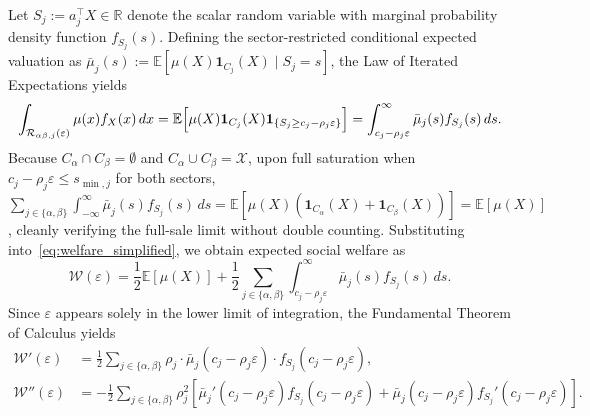 Let $S_j := a_j^\top X \in \mathbb{R}$ denote the scalar random variable with marginal probability density function $f_{S_j}(s)$. Defining the sector-restricted conditional expected valuation as $\bar{\mu}_j(s) := \mathbb{E}[\mu(X)\mathbf{1}_{C_j}(X) \mid S_j = s]$, the Law of Iterated Expectations yields
\begin{equation}
\label{eq:lie_disintegration_step}
\int_{\mathcal{R}_{\alpha\beta, j}(\varepsilon)} \mu(x) f_X(x) \, dx = \mathbb{E}\Bigl[\mu(X) \mathbf{1}_{C_j}(X) \mathbf{1}_{\{S_j \ge c_j - \rho_j \varepsilon\}}\Bigr] = \int_{c_j - \rho_j \varepsilon}^\infty \bar{\mu}_j(s) f_{S_j}(s) \, ds.
\end{equation}
Because $C_\alpha \cap C_\beta = \emptyset$ and $C_\alpha \cup C_\beta = \mathcal{X}$, upon full saturation when $c_j - \rho_j \varepsilon \le s_{\min, j}$ for both sectors, $\sum_{j \in \{\alpha, \beta\}} \int_{-\infty}^\infty \bar{\mu}_j(s) f_{S_j}(s) \, ds = \mathbb{E}[\mu(X)(\mathbf{1}_{C_\alpha}(X) + \mathbf{1}_{C_\beta}(X))] = \mathbb{E}[\mu(X)]$, cleanly verifying the full-sale limit without double counting. Substituting into~\eqref{eq:welfare_simplified}, we obtain expected social welfare as
\begin{equation}
\label{eq:welfare_1d_disintegration}
\mathcal{W}(\varepsilon) = \frac{1}{2} \mathbb{E}[\mu(X)] + \frac{1}{2} \sum_{j \in \{\alpha, \beta\}} \int_{c_j - \rho_j \varepsilon}^{\infty} \bar{\mu}_j(s) f_{S_j}(s) \, ds.
\end{equation}
Since $\varepsilon$ appears solely in the lower limit of integration, the Fundamental Theorem of Calculus yields
\begin{align}
\label{eq:w_prime_full}
\mathcal{W}'(\varepsilon) &= \frac{1}{2} \sum_{j \in \{\alpha, \beta\}} \rho_j \cdot \bar{\mu}_j(c_j - \rho_j \varepsilon) \cdot f_{S_j}(c_j - \rho_j \varepsilon), \\
\label{eq:w_double_prime_full}
\mathcal{W}''(\varepsilon) &= -\frac{1}{2} \sum_{j \in \{\alpha, \beta\}} \rho_j^2 \left[ \bar{\mu}_j'(c_j - \rho_j \varepsilon) f_{S_j}(c_j - \rho_j \varepsilon) + \bar{\mu}_j(c_j - \rho_j \varepsilon) f_{S_j}'(c_j - \rho_j \varepsilon) \right].
\end{align}


